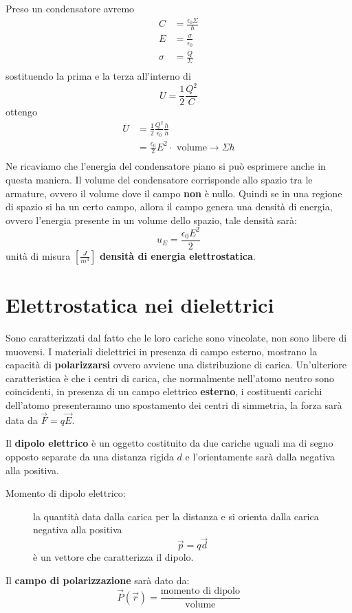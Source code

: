 \documentclass[a4paper, 12pt]{book}
\theoremstyle{plain}
\begin{document}
Preso un condensatore avremo 
\[
    \begin{split}
        C &= \frac{\epsilon_0 \Sigma}{h} \\
        E &= \frac{\sigma}{\epsilon_0} \\
        \sigma &= \frac{Q}{\Sigma} \\
    \end{split}
\]
sostituendo la prima e la terza all'interno di \[ U = \frac{1}{2} \frac{Q^2}{C} \]
ottengo 
\[
    \begin{split}
        U &= \frac{1}{2} \frac{Q^2}{\epsilon_0} \frac{h}{h} \\
        &= \frac{\epsilon_0}{2} E^2 \cdot \textrm{ volume} \rightarrow \Sigma h \\
    \end{split}    
\] 
Ne ricaviamo che l'energia del condensatore piano si può 
esprimere anche in questa maniera. Il volume del condensatore 
corrisponde allo spazio tra le armature, ovvero il volume 
dove il campo \textbf{non} è nullo. Quindi se in una regione 
di spazio si ha un certo campo, allora il campo 
genera una densità di energia, ovvero l'energia presente 
in un volume dello spazio, tale densità sarà:
\[ u_E = \frac{\epsilon_0 E^2}{2} \] 
unità di misura $[\frac{J}{m^3}]$ \textbf{densità di energia 
elettrostatica}.

\chapter{Elettrostatica nei dielettrici}

Sono caratterizzati dal fatto che le loro cariche sono vincolate, non sono libere di muoversi. I materiali dielettrici in presenza 
di campo esterno, mostrano la capacità di \textbf{polarizzarsi} ovvero avviene una distribuzione di carica. Un'ulteriore caratteristica 
è che i centri di carica, che normalmente nell'atomo neutro sono coincidenti, in presenza di un campo elettrico \textbf{esterno},
i costituenti carichi dell'atomo presenteranno uno spostamento dei centri di simmetria, la forza sarà data da $\vec{F} = q \vec{E}$.

Il \textbf{dipolo elettrico} è un oggetto costituito da due cariche uguali ma di segno opposto separate da una distanza rigida 
$d$ e l'orientamente sarà dalla negativa alla positiva. 
\begin{description}
    \item[Momento di dipolo elettrico:] la quantità data dalla carica per la distanza e si orienta dalla carica negativa alla positiva \[ \vec{p} = q \vec{d} \] è un vettore che caratterizza il dipolo. 
\end{description}
Il \textbf{campo di polarizzazione} sarà dato da:
\[
    \vec{P}(\vec{r}) = \frac{\textrm{momento di dipolo}}{\textrm{volume}}
\] 
\end{document}
